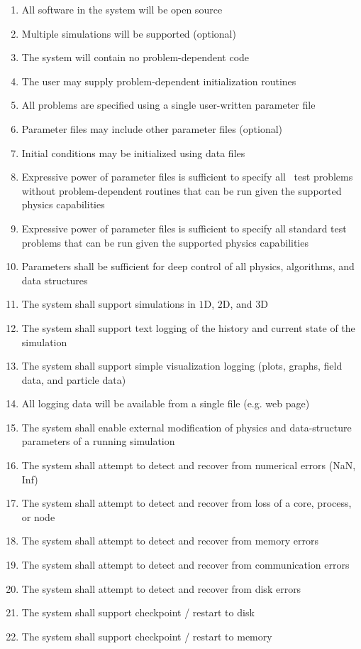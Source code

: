 \documentclass{book}
\begin{document}
\begin{enumerate}
\item  All software in the system will be open source
\item  Multiple simulations will be supported (optional)
\item  The system will contain no problem-dependent code
\item  The user may supply problem-dependent initialization routines
\item  All problems are specified using a single user-written parameter file
\item  Parameter files may include other parameter files (optional)
\item  Initial conditions may be initialized using data files
\item  Expressive power of parameter files is sufficient to specify all \enzo\ test problems without problem-dependent routines that can be run given the supported physics capabilities
\item  Expressive power of parameter files is sufficient to specify all standard test problems that can be run given the supported physics capabilities
\item Parameters shall be sufficient for deep control of all physics, algorithms, and data structures
\item The system shall support simulations in $1$D, $2$D, and $3$D
\item The system shall support text logging of the history and current state of the simulation
\item The system shall support simple visualization logging (plots, graphs, field data, and particle data)
\item All logging data will be available from a single file (e.g. web page)
\item The system shall enable external modification of physics and
  data-structure parameters of a running simulation
\item The system shall attempt to detect and recover from numerical errors (NaN, Inf)
\item The system shall attempt to detect and recover from loss of a core, process, or node
\item The system shall attempt to detect and recover from memory errors
\item The system shall attempt to detect and recover from communication errors
\item The system shall attempt to detect and recover from disk errors
\item The system shall support checkpoint / restart to disk
\item The system shall support checkpoint / restart to memory
\end{enumerate}
\end{document}
